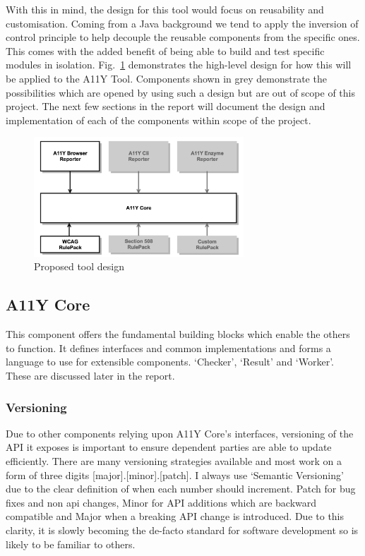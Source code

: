 With this in mind, the design for this tool would focus on reusability and
customisation. Coming from a Java background we tend to apply the inversion
of control principle \citep{DRC} to help decouple the reusable components from
the specific ones. This comes with the added benefit of being able to build
and test specific modules in isolation.
Fig.~\ref{fig:tool_proposed_design} demonstrates the high-level design for
how this will be applied to the A11Y Tool. Components shown in grey demonstrate
the possibilities which are opened by using such a design but are out of scope
of this project. The next few sections in the report will document the design
and implementation of each of the components within scope of the project.

\begin{figure}[H]
\centering
\includegraphics[width=0.7\textwidth]{figures/a11y_tool_proposed_design}
\captionsetup{justification=centering}
\caption{Proposed tool design
\label{fig:tool_proposed_design}}
\end{figure}

\subsection{A11Y Core}
This component offers the fundamental building blocks which enable the
others to function. It defines interfaces and common implementations and
forms a language to use for extensible components. `Checker', `Result' and
`Worker'. These are discussed later in the report.

\subsubsection{Versioning}
Due to other components relying upon A11Y Core's interfaces, versioning of
the API it exposes is important to ensure dependent parties are able to update
efficiently. There are many versioning strategies available and most work on
a form of three digits [major].[minor].[patch]. I always use `Semantic
Versioning' \citep{Semver} due to the clear definition of when each number should
increment.
Patch for bug fixes and non api changes, Minor for API additions which are
backward compatible and Major when a breaking API change is introduced. Due to this
clarity, it is slowly becoming the de-facto standard for software development
so is likely to be familiar to others.

